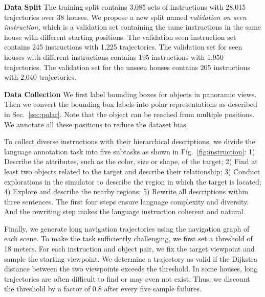 \documentclass[final]{cvpr}
\begin{document}
\noindent\textbf{Data Split}
The training split contains 3,085 sets of instructions with 28,015 trajectories over 38 houses. 
We propose a new split named \emph{validation on seen instruction}, which is a validation set containing the same instructions in the same house with different starting positions. 
The validation seen instruction set contains 245 instructions with 1,225 trajectories. 
The validation set for seen houses with different instructions contains 195 instructions with 1,950 trajectories. 
The validation set for the unseen houses contains 205 instructions with 2,040 trajectories. 


\noindent\textbf{Data Collection}
We first label bounding boxes for objects in panoramic views. Then we convert the bounding box labels into polar representations as described in Sec.~\ref{sec:polar}. Note that the object can be reached from multiple positions. 
We annotate all these positions to reduce the dataset bias. 

To collect diverse instructions with their hierarchical descriptions, we divide the language annotation task into five subtasks as shown in Fig.~\ref{fig:instruction}: 1) Describe the attributes, such as the color, size or shape, of the target; 2) Find at least two objects related to the target and describe their relationship; 3) Conduct explorations in the simulator to describe the region in which the target is located; 4) Explore and describe the nearby regions; 5) Rewrite all descriptions within three sentences. The first four steps ensure language complexity and diversity. 
And the rewriting step makes the language instruction coherent and natural. 

Finally, we generate long navigation trajectories using the navigation graph of each scene. To make the task sufficiently challenging, we first set a threshold of 18 meters. For each instruction and object pair, we fix the target viewpoint and sample the starting viewpoint. We determine a trajectory as valid if the Dijkstra distance between the two viewpoints exceeds the threshold. In some houses, long trajectories are often difficult to find or may even not exist. Thus, we discount the threshold by a factor of 0.8 after every five sample failures. 
\end{document}

